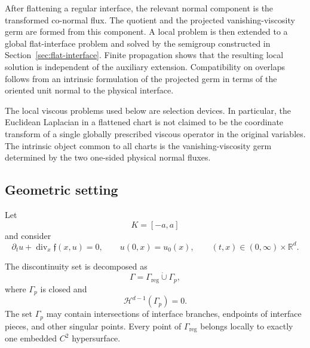 \documentclass[11pt]{amsart}
\numberwithin{equation}{section}
\theoremstyle{plain}
\theoremstyle{definition}
\theoremstyle{remark}
\begin{document}
After flattening a regular interface, the relevant normal component is the
transformed co-normal flux. The quotient and the projected
vanishing-viscosity germ are formed from this component. A local problem is
then extended to a global flat-interface problem and solved by the semigroup
constructed in Section~\ref{sec:flat-interface}. Finite propagation shows
that the resulting local solution is independent of the auxiliary extension.
Compatibility on overlaps follows from an intrinsic formulation of the
projected germ in terms of the oriented unit normal to the physical
interface.

The local viscous problems used below are selection devices. In particular,
the Euclidean Laplacian in a flattened chart is not claimed to be the
coordinate transform of a single globally prescribed viscous operator in the
original variables. The intrinsic object common to all charts is the
vanishing-viscosity germ determined by the two one-sided physical normal
fluxes.

\subsection{Geometric setting}
\label{subsec:general-geometry}

Let
\[
    K=[-a,a]
\]
and consider
\begin{equation}
\label{eq:general-main}
    \partial_t u+\operatorname{div}_x\mathfrak f(x,u)=0,
    \qquad
    u(0,x)=u_0(x),
    \qquad
    (t,x)\in(0,\infty)\times\mathbb R^d.
\end{equation}

The discontinuity set is decomposed as
\begin{equation}
\label{eq:general-interface-decomposition}
    \Gamma
    =
    \Gamma_{\mathrm{reg}}
    \mathbin{\dot\cup}
    \Gamma_p,
\end{equation}
where \(\Gamma_p\) is closed and
\begin{equation}
\label{eq:general-small-interaction-set}
    \mathcal H^{d-1}(\Gamma_p)=0.
\end{equation}
The set \(\Gamma_p\) may contain intersections of interface branches,
endpoints of interface pieces, and other singular points. Every point of
\(\Gamma_{\mathrm{reg}}\) belongs locally to exactly one embedded
\(C^2\) hypersurface.
\end{document}
